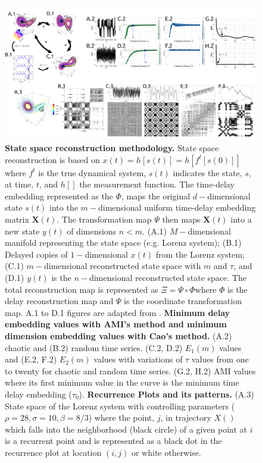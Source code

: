 \documentclass[fleqn,10pt]{wlscirep}
\begin{document}
\begin{figure}[ht]
\centering
\includegraphics[width=1.0\textwidth]{figures/fig01/versions/drawing-v00}
    \caption{
	{\bf State space reconstruction methodology.}
		State space reconstruction is based on $x(t)=h[s(t)]= h[f^t [s(0)]]$ where $f^t$ is the true dynamical system, $s(t)$ indicates the state, $s$, at time, $t$,  and $h[ ]$ the measurement function.
		The time-delay embedding represented as the $\Phi$, maps the original $d-$dimensional state $s(t)$ into the $m-$dimensional uniform time-delay embedding matrix $\boldsymbol{X}(t)$.
    	The transformation map $\Psi$ then maps $\boldsymbol{X}(t)$ into a new state $y(t)$ of dimensions $n < m$.
    	(A.1) $M-$dimensional manifold representing the state space (e.g. Lorenz system);
    	(B.1) Delayed copies of $1-$dimensional $x(t)$ from the Lorenz system;
		(C.1) $m-$dimensional reconstructed state space with \texorpdfstring{$m$}{m} and    \texorpdfstring{$\tau$}{T}, and
    	(D.1) $y(t)$ is the $n-$dimensional reconstructed state space.
	The total reconstruction map is represented as $\Xi = \Psi \circ \Phi $where $\Phi$ is the delay reconstruction map and $\Psi$ is the coordinate transformation map.
	A.1 to D.1 figures are adapted from \cite{Quintana-Duque2012, casdagli1991, uzal2011}.
	{\bf Minimum delay embedding values with AMI's method and minimum dimension embedding values with Cao's method.} 
	(A.2) chaotic and (B.2) random time series.
	(C.2, D.2) $E_1 (m)$ values and (E.2, F.2) $E_2(m)$ values with variations of $\tau$ values from one to twenty for chaotic and random time series.
	(G.2, H.2) AMI values where its first minimum value in the curve is the minimum time delay embedding ($\tau_0$).
	{\bf Recurrence Plots and its patterns.} 
	(A.3) State space of the Lorenz system with controlling parameters ($\rho=28, \sigma=10, \beta=8/3$) where the point, $j$, in trajectory $X()$ which falls into the neighborhood (black circle) of a given point at $i$ is a recurrent point and is represented as a black dot in the recurrence plot at location $(i, j)$ or white otherwise.
}
\end{figure}
\end{document}
